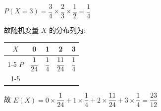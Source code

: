 \begin{enumerate}
\begin{enumerate}
\begin{jieda}
\begin{enumerate}
                $P\left( {X = 3}\right)  = \dfrac{3}{4} \times  \dfrac{2}{3} \times  \dfrac{1}{2} = \dfrac{1}{4}$
                
                故随机变量 $X$ 的分布列为:
                
                \begin{center}
                \begin{tabular}{|c|c|c|c|c|}
                \hline
                $X$ & 0 & 1 & 2 & 3 \\
                \cline{1-5}
                $P$ & $\dfrac{1}{24}$ & $\dfrac{1}{4}$ & $\dfrac{11}{24}$ & $\dfrac{1}{4}$ \\
                \cline{1-5}
                \hline
                \end{tabular}
                \end{center}
                
                故 $E\left( X\right)  = 0 \times  \dfrac{1}{24} + 1 \times  \dfrac{1}{4} + 2 \times  \dfrac{11}{24} + 3 \times  \dfrac{1}{4} = \dfrac{23}{12}$
            \end{enumerate}
        \end{jieda}
    \end{enumerate}
\end{enumerate}